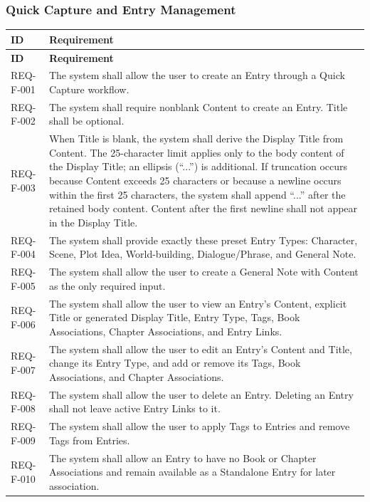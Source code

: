\documentclass[11pt,a4paper]{article}
\begin{document}
\subsubsection{Quick Capture and Entry Management}
\begin{longtable}{|L{2.2cm}|L{13.6cm}|}
\hline
\textbf{ID} & \textbf{Requirement} \\
\hline
\endfirsthead
\hline \textbf{ID} & \textbf{Requirement} \\
\hline
\endhead
REQ-F-001 & The system shall allow the user to create an Entry through a Quick Capture workflow. \\ \hline
REQ-F-002 & The system shall require nonblank Content to create an Entry. Title shall be optional. \\ \hline
REQ-F-003 & When Title is blank, the system shall derive the Display Title from Content. The 25-character limit applies only to the body content of the Display Title; an ellipsis (``...'') is additional. If truncation occurs because Content exceeds 25 characters or because a newline occurs within the first 25 characters, the system shall append ``...'' after the retained body content. Content after the first newline shall not appear in the Display Title. \\ \hline
REQ-F-004 & The system shall provide exactly these preset Entry Types: Character, Scene, Plot Idea, World-building, Dialogue/Phrase, and General Note. \\ \hline
REQ-F-005 & The system shall allow the user to create a General Note with Content as the only required input. \\ \hline
REQ-F-006 & The system shall allow the user to view an Entry's Content, explicit Title or generated Display Title, Entry Type, Tags, Book Associations, Chapter Associations, and Entry Links. \\ \hline
REQ-F-007 & The system shall allow the user to edit an Entry's Content and Title, change its Entry Type, and add or remove its Tags, Book Associations, and Chapter Associations. \\ \hline
REQ-F-008 & The system shall allow the user to delete an Entry. Deleting an Entry shall not leave active Entry Links to it. \\ \hline
REQ-F-009 & The system shall allow the user to apply Tags to Entries and remove Tags from Entries. \\ \hline
REQ-F-010 & The system shall allow an Entry to have no Book or Chapter Associations and remain available as a Standalone Entry for later association. \\ \hline
\end{longtable}
\end{document}
